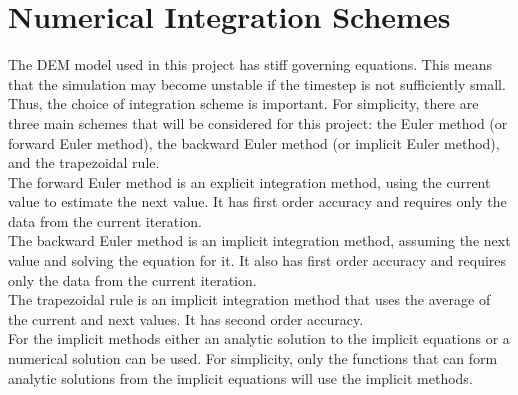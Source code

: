 \documentclass[10pt,a4paper,titlepage]{report}
\begin{document}
\section{Numerical Integration Schemes}
The DEM model used in this project has stiff governing equations. This means that the simulation may become unstable if the timestep is not sufficiently small. Thus, the choice of integration scheme is important. For simplicity, there are three main schemes that will be considered for this project: the Euler method (or forward Euler method), the backward Euler method (or implicit Euler method), and the trapezoidal rule.
\\The forward Euler method is an explicit integration method, using the current value to estimate the next value. It has first order accuracy and requires only the data from the current iteration.
\\The backward Euler method is an implicit integration method, assuming the next value and solving the equation for it. It also has first order accuracy and requires only the data from the current iteration.
\\The trapezoidal rule is an implicit integration method that uses the average of the current and next values. It has second order accuracy.
\\For the implicit methods either an analytic solution to the implicit equations or a numerical solution can be used. For simplicity, only the functions that can form analytic solutions from the implicit equations will use the implicit methods.
\end{document}

